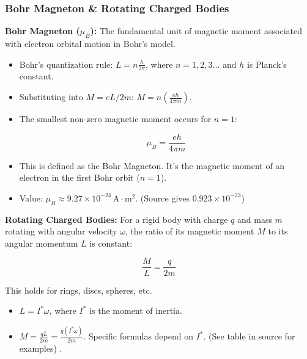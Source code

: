 \transfade[duration=0.5]

\begin{frame}[t]
    \frametitle{\textcolor{deepnavy}{\textbf{Bohr Magneton & Rotating Charged Bodies}}}
    \renewcommand{\familydefault}{\rmdefault}
    \small

      \item<+-> \textbf{Bohr Magneton ($\mu_B$):} The fundamental unit of magnetic moment associated with electron orbital motion in Bohr's model.
        \begin{itemize}[<+->]
              \item Bohr's quantization rule: $L = n \frac{h}{2\pi}$, where $n=1, 2, 3...$ and $h$ is Planck's constant.
              \item Substituting into $M = eL/2m$: $M = n \left( \frac{eh}{4\pi m} \right)$.
              \item The smallest non-zero magnetic moment occurs for $n=1$:
            \begin{tcolorbox}[colback=blue!5,colframe=blue!80,boxrule=0.5pt,arc=1mm,boxsep=1pt]
            \begin{equation*}
                 \mu_B = \frac{eh}{4\pi m}
            \end{equation*}
              \end{tcolorbox}
            \item This is defined as the Bohr Magneton.   It's the magnetic moment of an electron in the first Bohr orbit ($n=1$).
            \item Value: $\mu_B \approx 9.27 \times 10^{-24} \, \text{A}\cdot\text{m}^2$. (Source gives $0.923 \times 10^{-23}$)  
        \end{itemize}

      \item<+-> \textbf{Rotating Charged Bodies:} For a rigid body with charge $q$ and mass $m$ rotating with angular velocity $\omega$, the ratio of its magnetic moment $M$ to its angular momentum $L$ is constant:
        \begin{tcolorbox}[colback=orange!8,colframe=accentorange,boxrule=0.5pt,arc=1mm,boxsep=2pt]
        \begin{equation*}
             \frac{M}{L} = \frac{q}{2m}
        \end{equation*}
          \end{tcolorbox}
          This holds for rings, discs, spheres, etc.
        \begin{itemize}[<+->]
              \item $L = I^* \omega$, where $I^*$ is the moment of inertia.
              \item $M = \frac{q L}{2m} = \frac{q (I^* \omega)}{2m}$. Specific formulas depend on $I^*$. (See table in source for examples)  .
        \end{itemize}
\end{frame}

